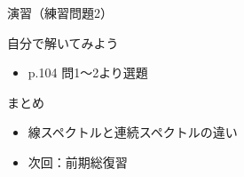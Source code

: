 \documentclass[aspectratio=43,professionalfonts,handout]{beamer}
\begin{document}
\begin{frame}{演習（練習問題2）}
  \begin{exampleblock}{自分で解いてみよう}
  \begin{itemize}
    \item p.104 問1〜2より選題
  \end{itemize}
  \end{exampleblock}
\end{frame}

\begin{frame}{まとめ}
  \begin{itemize}
    \item 線スペクトルと連続スペクトルの違い
    \item 次回：前期総復習
  \end{itemize}
\end{frame}
\end{document}
